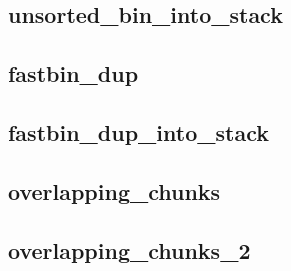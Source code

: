 \subsection{unsorted\_bin\_into\_stack}

\subsection{fastbin\_dup}

\subsection{fastbin\_dup\_into\_stack}

\subsection{overlapping\_chunks}

\subsection{overlapping\_chunks\_2}

\newpage